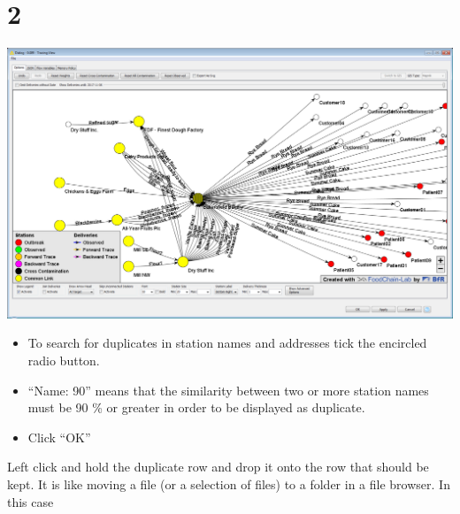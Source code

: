 \documentclass[10pt]{beamer}
\begin{document}
\section{2}
\begin{frame}
	\begin{center}
			\includegraphics[scale=0.4]{2.png}
	\end{center}
	\begin{itemize}
		\item To search for duplicates in station names and addresses tick the encircled radio button.
		\item ``Name: 90'' means that the similarity between two or more station names must be 90 \% or greater in order to be displayed as duplicate.
		\item Click ``OK''
	\end{itemize}
\end{frame}

Left click and hold the duplicate row and drop it onto the row that should be kept. It is like moving a file (or a selection of files) to a folder in a file browser. In this case
\end{document}
